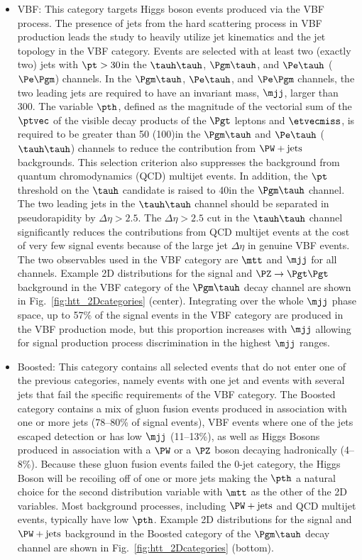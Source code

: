 \begin{itemize}
\item {VBF}: This category targets Higgs boson events produced via the VBF process.
The presence of jets from the hard scattering process in VBF production leads the study to heavily
utilize jet kinematics and the jet topology in the VBF category.
Events are selected with at least two (exactly two) jets with $\pt>30$\GeV in the
$\tauh\tauh$, $\Pgm\tauh$, and $\Pe\tauh$ ($\Pe\Pgm$) channels.
In the $\Pgm\tauh$, $\Pe\tauh$, and $\Pe\Pgm$ channels, the two leading jets are required to have 
an invariant mass, $\mjj$, larger than 300\GeV. The variable $\pth$, defined as the magnitude 
of the vectorial sum of the $\ptvec$ of the visible decay products of the $\Pgt$ leptons 
and $\etvecmiss$, is required to be greater than 50 (100)\GeV in the $\Pgm\tauh$
 and $\Pe\tauh$ ($\tauh\tauh$) channels to reduce the contribution from $\PW+\text{jets}$ 
backgrounds. This selection criterion also suppresses the background from quantum 
chromodynamics (QCD) multijet events. In addition, the $\pt$ threshold on the $\tauh$ 
candidate is raised to 40\GeV in the $\Pgm\tauh$ channel. The two leading jets in the 
$\tauh\tauh$ channel should be separated in pseudorapidity by $\Delta\eta>2.5$. The $\Delta\eta>2.5$
cut in the $\tauh\tauh$ channel significantly reduces the contributions from QCD multijet events at the cost
of very few signal events because of the large jet $\Delta\eta$ in genuine VBF events.
The two observables used in the VBF category are $\mtt$ and $\mjj$ for all channels. Example 2D 
distributions for the signal and $\PZ\to\Pgt\Pgt$ background
in the VBF category of the $\Pgm\tauh$ decay channel are shown in Fig.~\ref{fig:htt_2Dcategories} (center). 
Integrating over the whole $\mjj$ phase space, up to 57\% of the signal events in the VBF 
category are produced in the VBF production mode, but this proportion increases with $\mjj$ allowing
for signal production process discrimination in the highest $\mjj$ ranges.

\item {Boosted}: This category contains all selected events that do not enter one of the previous 
categories, namely events with one jet and events with several jets that fail the specific requirements of the VBF category.
The Boosted category contains a mix of gluon fusion events produced in association with one or more jets (78--80\% of signal events),
VBF events where one of the jets escaped detection or has low $\mjj$ (11--13\%), as well as
Higgs Bosons produced in association with a $\PW$ or a $\PZ$ boson decaying hadronically (4--8\%).
Because these gluon fusion events failed the 0-jet category, the Higgs Boson will be recoiling 
off of one or more jets making the $\pth$ a natural choice for the second distribution variable with
$\mtt$ as the other of the 2D variables. 
Most background processes, including $\PW+\text{jets}$ and QCD multijet events, typically have low $\pth$. 
Example 2D distributions for the signal and $\PW+\text{jets}$ background in the Boosted category of 
the $\Pgm\tauh$ decay channel are shown in Fig.~\ref{fig:htt_2Dcategories} (bottom).
\end{itemize}

